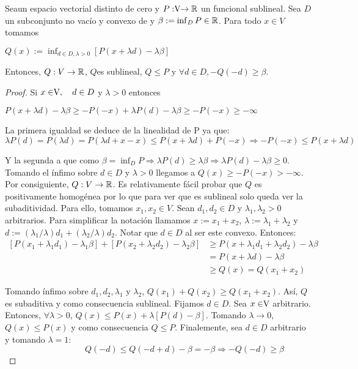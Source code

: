 	\begin{lemaBox}\label{lema2}
		Sea\vecSpace un espacio vectorial distinto de cero y $P:\vecSpace \rightarrow \RR$ un funcional sublineal. Sea $ D $ un subconjunto no vacío y convexo de \vecSpace y $ \beta := \inf_D P \in \mathbb{R} $. Para todo $ x \in V $ tomamos  
		\begin{center}
			$ Q(x) := \inf_{d \in D, \lambda > 0} \left[P(x+\lambda d) - \lambda \beta\right] $
		\end{center}
		
		Entonces, $ Q:V \rightarrow \mathbb{R}$, $ Q $es sublineal, $ Q \leq P $ y $ \forall d \in D, -Q(-d) \geq \beta$.
	\end{lemaBox} 
	\begin{proof}
		Si $ x \in \vecSpace, \quad d \in D $ y $ \lambda > 0 $ entonces
		\begin{center}
			$ P(x+ \lambda d) - \lambda \beta \geq -P(-x) + \lambda P(d)-\lambda\beta \geq -P(-x) \geq -\infty$
		\end{center}
		
		La primera igualdad se deduce de la linealidad de P ya que:
		\[ \lambda P(d) = P(\lambda d) =P(\lambda d +x-x) \leq P(x+\lambda d)+ P(-x) \Longrightarrow -P(-x) \leq P(x+\lambda d)\]
		
		Y la segunda a que como $ \beta = \inf_D P \Longrightarrow \lambda P(d) \geq \lambda\beta \Longrightarrow\lambda P(d) - \lambda\beta \geq 0 $. Tomando el ínfimo sobre $ d \in D  $ y $ \lambda > 0 $ llegamos a $ Q(x)\geq -P(-x) > -\infty$. Por consiguiente, $ Q:V \rightarrow \mathbb{R}$. Es relativamente fácil probar que $ Q $ es positivamente homogénea por lo que para ver que es sublineal solo queda ver la subaditividad. Para ello, tomamos $ x_1, x_2 \in V $. Sean $ d_1, d_2 \in D $ y $ \lambda_1, \lambda_2 > 0$ arbitrarios. Para simplificar la notación llamamos $ x := x_1 + x_2 $, $ \lambda := \lambda_1 + \lambda_2 $ y $ d:= (\lambda_1/\lambda)d_1 + (\lambda_2/\lambda)d_2 $. Notar que $ d \in D $ al ser este convexo. Entonces: 
		\begin{equation*}
		\begin{split}
		\left[ P(x_1 + \lambda_1 d_1) - \lambda_1 \beta \right] + \left[ P(x_2 + \lambda_2 d_2) - \lambda_2 \beta \right] &\geq P(x + \lambda_1 d_1 + \lambda_2 d_2) - \lambda \beta\\
		& = P(x +\lambda d) - \lambda \beta\\ 
		& \geq Q(x) = Q(x_1 + x_2)
		\end{split}
		\end{equation*}
		
		Tomando ínfimo sobre $ d_1, d_2, \lambda_1 $ y $ \lambda_2 $, $  Q(x_1) + Q (x_2 ) \geq Q (x_1 + x_2 ) $. Así, $ Q $ es subaditiva y como consecuencia sublineal. Fijamos $ d \in D $. Sea $ x \in \vecSpace $ arbitrario. Entonces, $ \forall \lambda > 0 $, $ Q(x) \leq P(x) + \lambda \left[P(d) - \beta \right]$. Tomando $ \lambda \longrightarrow 0 $, $ Q(x) \leq P(x)$ y como consecuencia $ Q \leq P $. Finalemente, sea $ d \in D $ arbitrario y tomando $ \lambda = 1 $:
		\[ \qquad \qquad \qquad Q(-d) \leq Q(-d+d) - \beta = -\beta \Longrightarrow  -Q(-d) \geq \beta  \]
		
	\end{proof}

